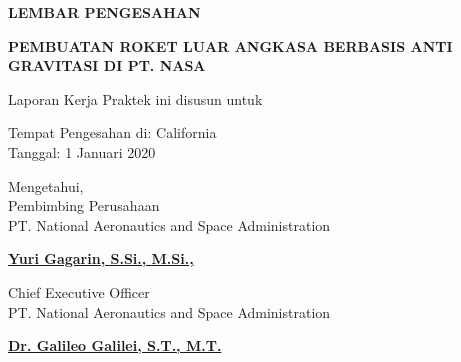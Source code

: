 \begin{center}
  {\Large \textbf{LEMBAR PENGESAHAN}}
  \vspace{6ex}

  {\large \textbf{PEMBUATAN ROKET LUAR ANGKASA BERBASIS ANTI GRAVITASI DI PT. NASA}}
  \vspace{6ex}

  Laporan Kerja Praktek ini disusun untuk \lipsum[1][1]
  \vspace{2ex}

  Tempat Pengesahan di: California \\
  Tanggal: 1 Januari 2020
  \vspace{8ex}

  Mengetahui, \\
  Pembimbing Perusahaan \\
  PT. National Aeronautics and Space Administration
  \vspace{12ex}

  \textbf{\underline{Yuri Gagarin, S.Si., M.Si.,}}
  \vspace{6ex}

  Chief Executive Officer \\
  PT. National Aeronautics and Space Administration
  \vspace{12ex}

  \textbf{\underline{Dr. Galileo Galilei, S.T., M.T.}}

\end{center}